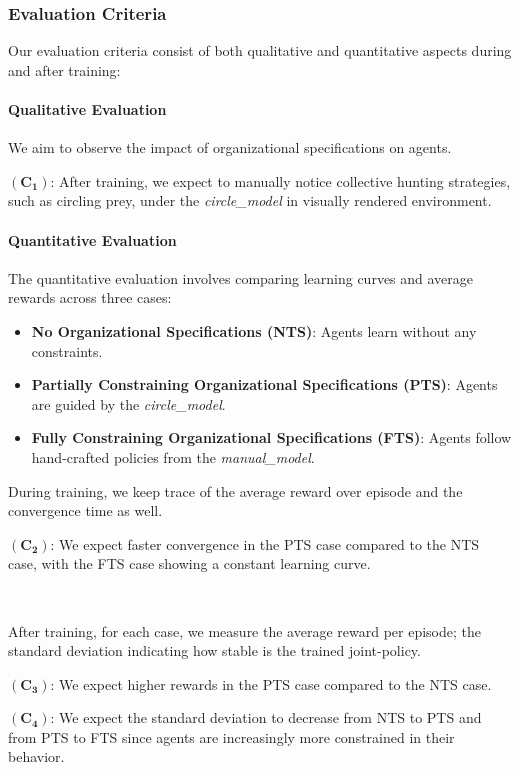 \documentclass[runningheads]{llncs}
\theoremstyle{freethm}
\theoremstyle{proofoutline}
\begin{document}
\subsubsection{Evaluation Criteria}

Our evaluation criteria consist of both qualitative and quantitative aspects during and after training:

\paragraph{Qualitative Evaluation} We aim to observe the impact of organizational specifications on agents.

$(\mathbf{C_1})$: After training, we expect to manually notice collective hunting strategies, such as circling prey, under the \textit{circle\_model} in visually rendered environment.

\paragraph{Quantitative Evaluation} The quantitative evaluation involves comparing learning curves and average rewards across three cases:
\begin{itemize}
    \item \textbf{No Organizational Specifications (NTS)}: Agents learn without any constraints.
    \item \textbf{Partially Constraining Organizational Specifications (PTS)}: Agents are guided by the \textit{circle\_model}.
    \item \textbf{Fully Constraining Organizational Specifications (FTS)}: Agents follow hand-crafted policies from the \textit{manual\_model}.
\end{itemize}

\noindent During training, we keep trace of the average reward over episode and the convergence time as well.

$(\mathbf{C_2})$: We expect faster convergence in the PTS case compared to the NTS case, with the FTS case showing a constant learning curve.

\

\noindent After training, for each case, we measure the average reward per episode; the standard deviation indicating how stable is the trained joint-policy.

$(\mathbf{C_3})$: We expect higher rewards in the PTS case compared to the NTS case.

$(\mathbf{C_4})$: We expect the standard deviation to decrease from NTS to PTS and from PTS to FTS since agents are increasingly more constrained in their behavior.
\end{document}
